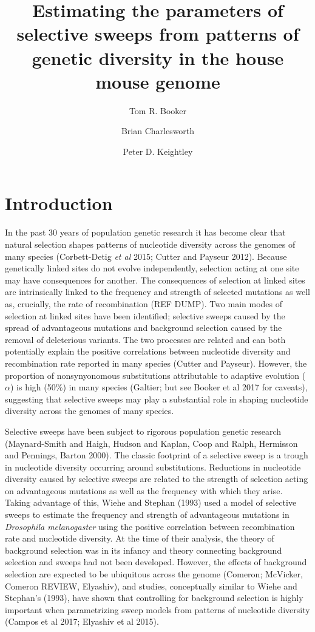 \documentclass[11pt]{article}
\title{\textbf{Estimating the parameters of selective sweeps from patterns of genetic diversity in the house mouse genome}}
\author[1,*]{Tom R. Booker}
\author[1]{Brian Charlesworth}
\author[1]{Peter D. Keightley}
\affil[1]{Institute of Evolutionary Biology, University of Edinburgh, Edinburgh}
\affil[*]{\emph{t.r.booker@sms.ed.ac.uk}}
\begin{document}
\maketitle
\begin{abstract}


\end{abstract}

\section*{Introduction}

In the past 30 years of population genetic research it has become clear that natural selection shapes patterns of nucleotide diversity across the genomes of many species (Corbett-Detig \textit{et al} 2015; Cutter and Payseur 2012). Because genetically linked sites do not evolve independently, selection acting at one site may have consequences for another. The consequences of selection at linked sites are intrinsically linked to the frequency and strength of selected mutations as well as, crucially, the rate of recombination (REF DUMP). Two main modes of selection at linked sites have been identified; selective sweeps caused by the spread of advantageous mutations and background selection caused by the removal of deleterious variants. The two processes are related and can both potentially explain the positive correlations between nucleotide diversity and recombination rate reported in many species (Cutter and Payseur). However, the proportion of nonsynyonomous substitutions attributable to adaptive evolution ($\alpha$) is  high (50\%) in many species (Galtier; but see Booker et al 2017 for caveats), suggesting that selective sweeps may play a substantial role in shaping nucleotide diversity across the genomes of many species.

Selective sweeps have been subject to rigorous population genetic research (Maynard-Smith and Haigh, Hudson and Kaplan, Coop and Ralph, Hermisson and Pennings, Barton 2000). The classic footprint of a selective sweep is a trough in nucleotide diversity occurring around substitutions. Reductions in nucleotide diversity caused by selective sweeps are related to the strength of selection acting on advantageous mutations as well as the frequency with which they arise. Taking advantage of this, Wiehe and Stephan (1993) used a model of selective sweeps to estimate the frequency and strength of advantageous mutations in \textit{Drosophila melanogaster} using the positive correlation between recombination rate and nucleotide diversity. At the time of their analysis, the theory of background selection was in its infancy and theory connecting background selection and sweeps had not been developed. However, the effects of background selection are expected to be ubiquitous across the genome (Comeron; McVicker, Comeron REVIEW, Elyashiv), and studies, conceptually similar to Wiehe and Stephan's (1993), have shown that controlling for background selection is highly important when parametrizing sweep models from patterns of nucleotide diversity (Campos et al 2017; Elyashiv et al 2015).
\end{document}
